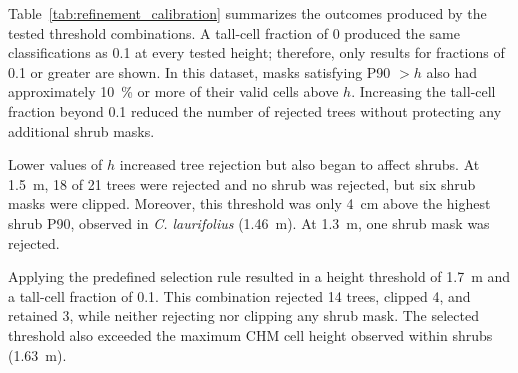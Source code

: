 \documentclass[12pt,a4paper]{article}
\begin{document}
Table~\ref{tab:refinement_calibration} summarizes the outcomes produced by the tested threshold combinations. A tall-cell fraction of 0 produced the same classifications as 0.1 at every tested height; therefore, only results for fractions of 0.1 or greater are shown. In this dataset, masks satisfying P90 $> h$ also had approximately \qty{10}{\percent} or more of their valid cells above $h$. Increasing the tall-cell fraction beyond 0.1 reduced the number of rejected trees without protecting any additional shrub masks.

Lower values of $h$ increased tree rejection but also began to affect shrubs. At \qty{1.5}{\metre}, 18 of 21 trees were rejected and no shrub was rejected, but six shrub masks were clipped. Moreover, this threshold was only \qty{4}{\centi\metre} above the highest shrub P90, observed in \textit{C. laurifolius} (\qty{1.46}{\metre}). At \qty{1.3}{\metre}, one shrub mask was rejected.

Applying the predefined selection rule resulted in a height threshold of \qty{1.7}{\metre} and a tall-cell fraction of 0.1. This combination rejected 14 trees, clipped 4, and retained 3, while neither rejecting nor clipping any shrub mask. The selected threshold also exceeded the maximum CHM cell height observed within shrubs (\qty{1.63}{\metre}).
\end{document}
